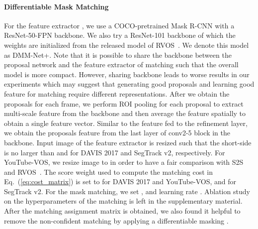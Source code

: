\paragraph{Differentiable Mask Matching}
For the feature extractor , we use a COCO-pretrained Mask R-CNN with a ResNet-50-FPN backbone. 
We also try a ResNet-101 backbone of which the weights are initialized from the released model of RVOS~\cite{Ventura_2019_CVPR}.
We denote this model as DMM-Net+. 
Note that it is possible to share the backbone between the proposal network and the feature extractor of matching such that the overall model is more compact. 
However, sharing backbone leads to worse results in our experiments which may suggest that generating good proposals and learning good feature for matching require different representations.
After we obtain the proposals for each frame, we perform ROI pooling for each proposal to extract multi-scale feature from the backbone and then average the feature spatially to obtain a single feature vector. Similar to the feature fed to the refinement layer, we obtain the proposals feature from the last layer of conv2-5 block in the backbone. 
Input image of the feature extractor is resized such that the short-side is no larger than  and  for DAVIS 2017 and SegTrack v2, respectively. 
For YouTube-VOS, we resize image to  in order to have a fair comparison with S2S~\cite{Xu2018YouTubeVOSSV} and RVOS~\cite{Ventura_2019_CVPR}.
The score weight  used to compute the matching cost in Eq.~(\ref{eq:cost_matrix}) is set to  for DAVIS 2017 and YouTube-VOS, and  for SegTrack v2.
For the mask matching, we set ,  and learning rate . Ablation study on the hyperparameters of the matching is left in the supplementary material. 
After the matching assignment matrix  is obtained, we also found it helpful to remove the non-confident matching by applying a differentiable masking  .

